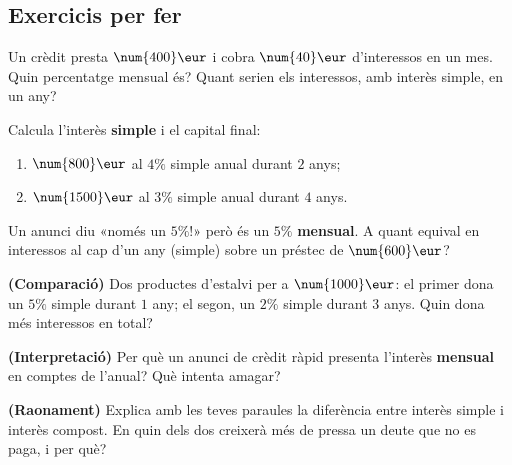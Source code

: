 \subsection{Exercicis per fer}

\begin{exercicis}
\begin{exlist}
  \item Un crèdit presta $\num{400}\eur$ i cobra $\num{40}\eur$ d'interessos en un mes.
        Quin percentatge mensual és? Quant serien els interessos, amb interès simple,
        en un any?
  \item Calcula l'interès \textbf{simple} i el capital final:
    \begin{enumerate}[label=\alph*), leftmargin=1.6em, topsep=2pt]
      \item $\num{800}\eur$ al $4\%$ simple anual durant $2$ anys;
      \item $\num{1500}\eur$ al $3\%$ simple anual durant $4$ anys.
    \end{enumerate}
  \item Un anunci diu «només un $5\%$!» però és un $5\%$ \textbf{mensual}. A quant
        equival en interessos al cap d'un any (simple) sobre un préstec de
        $\num{600}\eur$?
  \item \textbf{(Comparació)} Dos productes d'estalvi per a $\num{1000}\eur$: el primer
        dona un $5\%$ simple durant $1$ any; el segon, un $2\%$ simple durant $3$ anys.
        Quin dona més interessos en total?
  \item \textbf{(Interpretació)} Per què un anunci de crèdit ràpid presenta l'interès
        \textbf{mensual} en comptes de l'anual? Què intenta amagar?
  \item \textbf{(Raonament)} Explica amb les teves paraules la diferència entre interès
        simple i interès compost. En quin dels dos creixerà més de pressa un deute que
        no es paga, i per què?
\end{exlist}
\end{exercicis}

